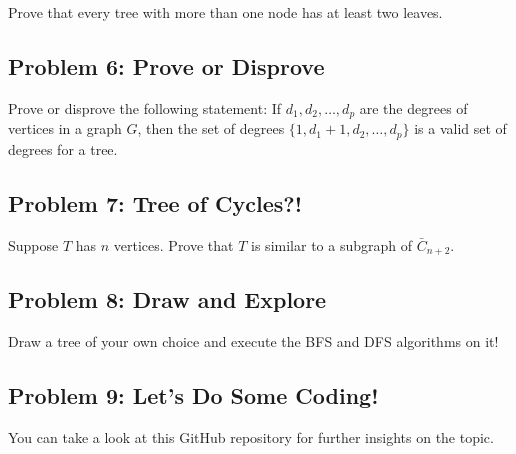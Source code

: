 \documentclass{article}
\begin{document}
Prove that every tree with more than one node has at least two leaves.

\subsection*{Problem 6: Prove or Disprove}

Prove or disprove the following statement: If $d_1, d_2, \ldots, d_p$ are the degrees of vertices in a graph $G$, then the set of degrees \( \{1, d_1 + 1, d_2, \ldots, d_p\} \) is a valid set of degrees for a tree.

\subsection*{Problem 7: Tree of Cycles?!}

Suppose $T$ has $n$ vertices. Prove that $T$ is similar to a subgraph of $\bar{C}_{n+2}$.

\subsection*{Problem 8: Draw and Explore}

Draw a tree of your own choice and execute the BFS and DFS algorithms on it!

\subsection*{Problem 9: Let's Do Some Coding!}

You can take a look at this GitHub repository for further insights on the topic.
\end{document}
